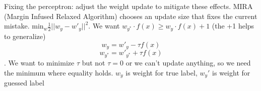 \documentclass[10pt,twocolumn]{article}
\begin{document}
		Fixing the perceptron: adjust the weight update to mitigate these effects. MIRA (Margin Infused Relaxed Algorithm) chooses an update size that fixes the current mistake.  $\text{min}_w \frac{1}{2} ||w_y-w'_y||^2$. We want $w_{y^*}\cdot f(x) \geq w_y\cdot f(x)+1$ (the +1 helps to generalize) \[w_y=w'_y-\tau f(x)\] \[w_{y^*}=w'_{y^*}+\tau f(x)\]. We want to minimize $\tau$ but not $\tau =0$ or we can't update anything, so we need the minimum where equality holds. $w_y$ is weight for true label, $w_y'$ is weight for guessed label
\end{document}
